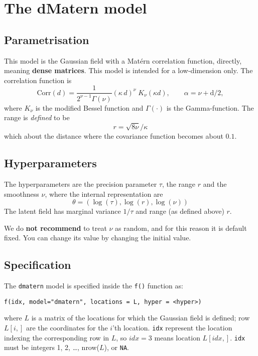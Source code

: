 \documentclass[a4paper,11pt]{article}
\begin{document}


\section*{The dMatern model}
\subsection*{Parametrisation}

This model is the Gaussian field with a Mat\'ern correlation function,
directly, meaning \textbf{dense matrices}. This model is intended for
a low-dimension only. The correlation function is 
\begin{displaymath}
    \text{Corr}(d)
    = \frac{1}{2^{\nu-1}\Gamma(\nu)}
    \left(\kappa\, {d}\right)^{\nu}
    \;
    K_{\nu}( \kappa d), \qquad \alpha = \nu + \text{d}/2,
\end{displaymath}
where $K_{\nu}$ is the modified Bessel function and $\Gamma(\cdot)$ is
the Gamma-function. The range is \emph{defined} to be
\begin{displaymath}
    r = {\sqrt{8\nu}}/{\kappa}
\end{displaymath}
which about the distance where the covariance function becomes
about $0.1$.

\subsection*{Hyperparameters}

The hyperparameters are the precision parameter $\tau$, the range $r$
and the smoothness $\nu$, where the internal representation are
\begin{displaymath}
    \theta = (\log(\tau), \log(r), \log(\nu))
\end{displaymath}
The latent field has marginal variance $1/\tau$ and range (as defined
above) $r$.

We do \textbf{not recommend} to treat $\nu$ as random, and for this
reason it is default fixed. You can change its value by changing the
initial value.

\subsection*{Specification}

The {\tt dmatern} model is specified inside the {\tt f()} function as:
\begin{verbatim}
f(idx, model="dmatern", locations = L, hyper = <hyper>)
\end{verbatim}
where $L$ is a matrix of the locations for which the Gaussian field is
defined; row $L[i,]$ are the coordinates for the $i$'th location.
\verb|idx| represent the location indexing the corresponding row in
$L$, so $idx=3$ means location $L[idx,]$. \verb|idx| must be integers
1, 2, \ldots, nrow($L$), or \texttt{NA}.
\end{document}
